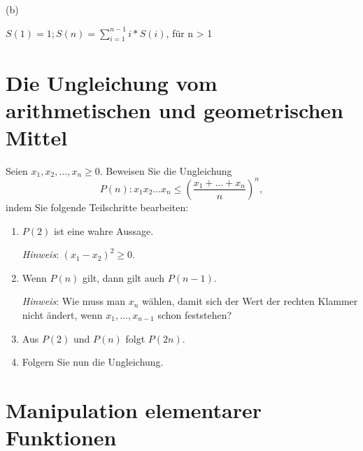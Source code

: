 \begin{flushleft}
	(b)
\end{flushleft}
\begin{center}
$S(1) = 1; S(n) = \displaystyle\sum_{i=1}^{n-1}i * S(i)$, für n > 1 
\end{center}

\newpage

\section{Die Ungleichung vom arithmetischen und geometrischen Mittel}


Seien $x_1, x_2, \ldots, x_n \geq 0$. Beweisen Sie
die Ungleichung
\[
P(n): x_1 x_2 \ldots x_n
\leq\left(\frac{x_1+\dots+x_n}{n}\right)^n,
\]
indem Sie folgende Teilschritte bearbeiten:
\begin{enumerate}
  \item $P(2)$ ist eine wahre Aussage.

     \emph{Hinweis}: $(x_1 - x_2)^2 \geq 0$.
  \item
     Wenn $P(n)$ gilt, dann gilt auch $P(n-1)$.

     \emph{Hinweis}: Wie muss man $x_n$ w\"ahlen, damit 
     sich der Wert der rechten Klammer nicht \"andert, wenn
     $x_1, \ldots, x_{n-1}$ schon feststehen?

   \item Aus $P(2)$ und $P(n)$ folgt $P(2n)$.
   \item Folgern Sie nun die Ungleichung. 
\end{enumerate}

\newpage

\section{Manipulation elementarer Funktionen}

